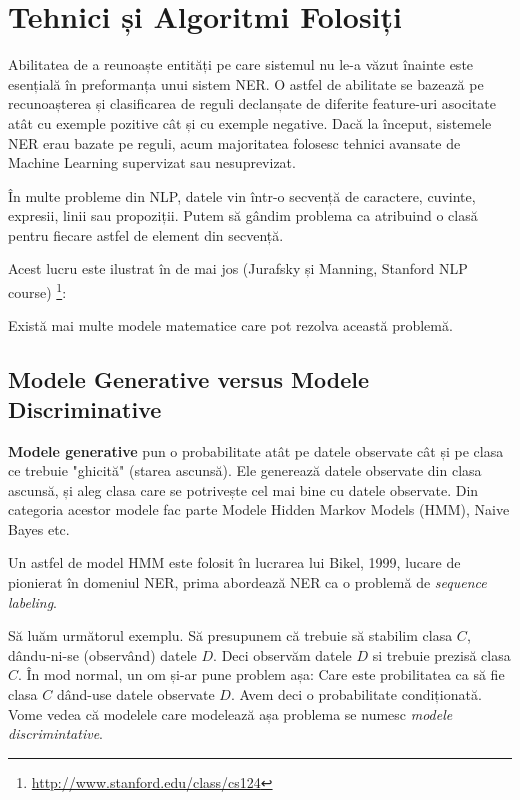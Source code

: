 \chapter{Tehnici și Algoritmi Folosiți}
\label{chapter:algorithms}

Abilitatea de a reunoaște entități pe care sistemul nu le-a văzut înainte este esențială în preformanța unui sistem NER. O astfel de abilitate se bazează pe recunoașterea și clasificarea de reguli declanșate de diferite feature-uri asocitate atât cu exemple pozitive cât și cu exemple negative. Dacă la început, sistemele NER erau bazate pe reguli, acum majoritatea folosesc tehnici avansate de Machine Learning supervizat sau nesuprevizat. 

În multe probleme din NLP, datele vin într-o secvență de caractere, cuvinte, expresii, linii sau propoziții. Putem să gândim problema ca atribuind o clasă pentru fiecare astfel de element din secvență.

Acest lucru este ilustrat în  de mai jos (Jurafsky și Manning, Stanford NLP course) \footnote{\url{http://www.stanford.edu/class/cs124}}:


Există mai multe modele matematice care pot rezolva această problemă.

\section{Modele Generative versus Modele Discriminative}

\textbf{Modele generative} pun o probabilitate atât pe datele observate cât și pe clasa ce trebuie "ghicită" (starea ascunsă). Ele generează datele observate din clasa ascunsă, și aleg clasa care se potrivește cel mai bine cu datele observate. Din categoria acestor modele fac parte Modele Hidden Markov Models (HMM), Naive Bayes etc. 

Un astfel de model HMM este folosit în lucrarea lui Bikel, 1999, lucare de pionierat în domeniul NER, prima abordează NER ca o problemă de \textit{sequence labeling}.\cite{Bikel99analgorithm}

Să luăm următorul exemplu. Să presupunem că trebuie să stabilim clasa $C$, dându-ni-se (observând) datele $D$. Deci observăm datele $D$ si trebuie prezisă clasa $C$. În mod normal, un om și-ar pune problem așa: Care este probilitatea ca să fie clasa $C$ dând-use datele observate $D$. Avem deci o probabilitate condiționată. Vome vedea că modelele care modelează așa problema se numesc \textit{modele discrimintative}.

